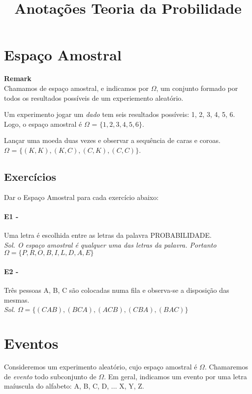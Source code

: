 \documentclass[10pt,a4paper]{article}
\title{Anotações Teoria da Probilidade}
\begin{document}
\maketitle
\small
\section{Espaço Amostral}
\begin{mdframed}[linewidth=0.6pt]
\textbf{Remark}\\
	Chamamos de espaço amostral, e indicamos por $\Omega$, um conjunto formado por todos os
	resultados possíveis de um experiemento aleatório.
\end{mdframed}

\begin{eg}
	Um experimento jogar um \textit{dado} tem seis resultados possíveis: 1, 2, 3, 4, 5, 6. Logo, o espaço amostral é $\Omega$ = $\lbrace1, 2, 3, 4, 5, 6\rbrace$.
\end{eg}
\begin{eg} 
	Lançar uma moeda duas vezes e observar a sequência de caras e coroas.\\
	$\Omega$ = $\lbrace (K,K), (K,C), (C,K), (C,C)\rbrace$.
\end{eg}

\subsection{Exercícios}
Dar o Espaço Amostral para cada exercício abaixo:\\
\paragraph{E1 - }Uma letra é escolhida entre as letras da palavra PROBABILIDADE.\\
\textit{Sol. O espaço amostral é qualquer uma das letras da palavra. Portanto \\
$\Omega = \lbrace P, R, O, B, I, L, D, A, E \rbrace$}

\paragraph{E2 - }Três pessoas A, B, C são colocadas numa fila e observa-se a disposição das mesmas.\\
\textit{Sol. $\Omega = \lbrace (CAB), (BCA), (ACB), (CBA), (BAC) \rbrace$}

\section{Eventos}
Consideremos um experimento aleatório, cujo espaço amostral é $\Omega$. Chamaremos de \textit{evento} todo subconjunto de $\Omega$. Em geral, indicamos um evento por uma letra maíuscula do alfabeto: A, B, C, D, ... X, Y, Z.
\end{document}
